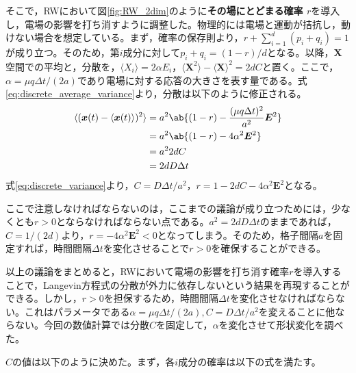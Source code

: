 \documentclass[autodetect-engine,dvi=dvipdfmx,a4paper,ja=standard,oneside,openany,11pt,draft]{bxjsbook}
\begin{document}
そこで，RWにおいて図\ref{fig:RW_2dim}のように\textbf{その場にとどまる確率 $r$}を導入し，電場の影響を打ち消すように調整した。物理的には電場と運動が拮抗し，動けない場合を想定している。まず，確率の保存則より，$r+\sum_{i=1}^{d}(p_i+q_i) =1$が成り立つ。そのため，第$i$成分に対して$p_i+q_i=(1-r)/d$となる。以降，$\bm{X}$空間での平均と，分散を，$\langle X_i\rangle=2\alpha E_i$，$\langle\bm{X}^2\rangle-\langle\bm{X}\rangle^2=2dC$と置く。ここで，$\alpha=\mu q\Delta t/(2a)$であり電場に対する応答の大きさを表す量である。式\ref{eq:discrete_average_variance}より，分散は以下のように修正される。
\begin{equation}
  \begin{split}
    \langle(\bm{x}(t)-\langle\bm{x}(t)\rangle)^2\rangle & =a^2\ab\{(1-r)-\frac{(\mu q \Delta t)^2}{a^2}\bm{E}^2\} \\
                                                        & =a^2\ab\{(1-r)-4\alpha^2\bm{E}^2\}                      \\
                                                        & =a^2 2dC                                                \\
                                                        & =2dD\Delta t
  \end{split}
  \label{eq:discrete_variance}
\end{equation}
式\ref{eq:discrete_variance}より，$C=D\Delta t/a^2$，$r=1-2dC-4\alpha^2\bm{E}^2$となる。

ここで注意しなければならないのは，ここまでの議論が成り立つためには，少なくとも$r>0$とならなければならない点である。$a^2=2dD\Delta t$のままであれば，$C=1/(2d)$より，$r=-4\alpha^2\bm{E}^2<0$となってしまう。そのため，格子間隔$a$を固定すれば，時間間隔$\Delta t$を変化させることで$r>0$を確保することができる。

以上の議論をまとめると，RWにおいて電場の影響を打ち消す確率$r$を導入することで，Langevin方程式の分散が外力に依存しないという結果を再現することができる。しかし，$r>0$を担保するため，時間間隔$\Delta t$を変化させなければならない。これはパラメータである$\alpha=\mu q\Delta t/(2a),C=D\Delta t/a^2$を変えることに他ならない。今回の数値計算では分散$C$を固定して，$\alpha$を変化させて形状変化を調べた。

$C$の値は以下のように決めた。まず，各$i$成分の確率は以下の式を満たす。
\end{document}
